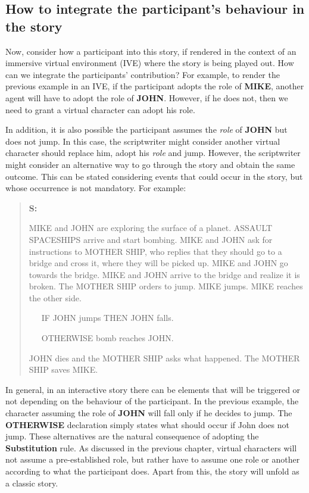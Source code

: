 \documentclass[
		twoside,openright,titlepage,numbers=noenddot,manychapters,
		headinclude,%
                footinclude=false,cleardoublepage=empty,
                BCOR=5mm,
		fontsize=11pt, %
                 enabledeprecatedfontcommands]{scrreprt}
\begin{document}
\subsection{How to integrate the participant's behaviour in the story}

Now, consider how a participant into this story, if rendered in the context of an immersive virtual environment (IVE) where the story is being played out. How can we integrate the participants’ contribution? For example, to render the previous example in an IVE, if the participant adopts the role of \textbf{MIKE}, another agent will have to adopt the role of \textbf{JOHN}. However, if he does not, then we need to grant a virtual character can adopt his role.

In addition, it is also possible the participant assumes the \emph{role}  of \textbf{JOHN} but does not jump. In this case, the scriptwriter might consider another virtual character should replace him, adopt his \emph{role}  and jump. However,  the scriptwriter might consider an alternative way to go through the story and obtain the same outcome. This can be stated considering events that could occur in the story, but whose occurrence is not mandatory. For example:


\begin{quote}\begin{small}\label{the_script}
{\bf
S:

MIKE and JOHN are exploring the surface of a planet. ASSAULT SPACESHIPS arrive and start bombing. MIKE and JOHN ask for instructions to MOTHER SHIP, who replies that they should go to a bridge and cross it, where they will be picked up. MIKE and JOHN go towards the bridge. MIKE and JOHN arrive to the bridge and realize it is broken. The MOTHER SHIP orders to jump. MIKE jumps. MIKE reaches the other side. 

 \ \ \	IF JOHN jumps THEN JOHN falls. 

\ \ \	OTHERWISE bomb reaches JOHN.

JOHN dies and the MOTHER SHIP asks what happened. The MOTHER SHIP saves MIKE.
}
\end{small}
\end{quote}


In general, in an interactive story there can be elements that will be triggered or not depending on the behaviour of the participant. In the previous example, the character assuming the role of \textbf{JOHN} will fall only if he decides to jump. 
The \textbf{OTHERWISE} declaration simply states what should occur if John does not jump. These alternatives are the natural consequence of adopting the \textbf{Substitution} rule. As discussed in the previous chapter, virtual characters will not assume a pre-established role, but rather have to assume one role or another according to what the participant does. Apart from this, the story will unfold as a classic story.
\end{document}
